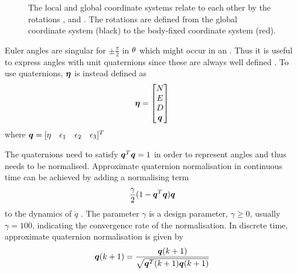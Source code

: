 \begin{figure}
    \caption{The local and global coordinate systems relate to each other by the rotations \yawAngle, \pitchAngle and \rollAngle. The rotations are defined from the global coordinate system (black) to the body-fixed coordinate system (red).} 
    \label{fig:coordinate_frames}
\end{figure}




 
Euler angles are singular for $\pm \frac{\pi}{2}$ in $\theta$ which might occur in an \abbrROV. Thus it is useful to express angles with unit quaternions since these are always well defined \citep{sensorfusion}. To use quaternions, $\boldsymbol{\eta}$ is instead defined as
\begin{equation}
\boldsymbol{\eta} = \begin{bmatrix}
N \\
E \\
D \\
\boldsymbol{q}
\end{bmatrix}
\end{equation} where $\boldsymbol{q} =[\eta\quad \epsilon_1\quad \epsilon_2\quad \epsilon_3]^T$

The quaternions need to satisfy $\boldsymbol{q}^T\boldsymbol{q} = 1$ in order to represent angles and thus needs to be normalised.
Approximate quaternion normalisation in continuous time can be achieved by adding a normalising term
\begin{equation}
\frac{\gamma}{2} ( 1 - \boldsymbol{q}^T\boldsymbol{q})\boldsymbol{q}
\end{equation}
to the dynamics of $\dot{q}$ \citep[p. 31]{fossen2011}. The parameter $\gamma$ is a design parameter, $\gamma \geq 0$, usually $\gamma = 100$, indicating the convergence rate of the normalisation. In discrete time, approximate quaternion normalisation is given by 
\begin{equation} \label{eq:quatnorm}
\boldsymbol{q}(k+1) = \frac{\boldsymbol{q}(k+1)}{\sqrt{\boldsymbol{q}^T(k+1)\boldsymbol{q}(k+1)}}
\end{equation}  

